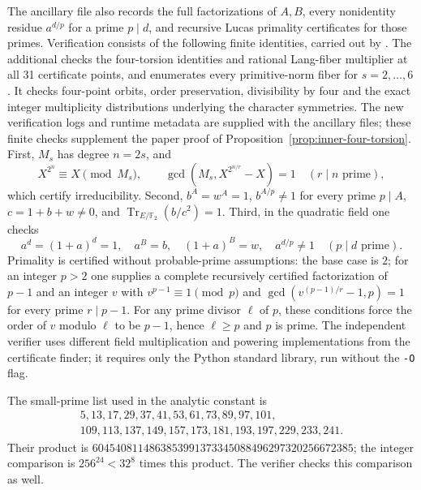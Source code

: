 \documentclass[11pt]{article}
\begin{document}
The ancillary file  also records
the full factorizations of $A,B$, every nonidentity residue
$a^{d/p}$ for a prime $p\mid d$, and recursive Lucas primality
certificates for those primes. Verification consists of the following
finite identities, carried out by .
The additional  checks the
four-torsion identities and rational Lang-fiber multiplier at
all 31 certificate points, and enumerates every primitive-norm
fiber for $s=2,\ldots,6$. It checks four-point orbits, order
preservation, divisibility by four and the exact integer
multiplicity distributions underlying the character symmetries.
The new verification logs and runtime metadata are supplied with
the ancillary files; these finite checks supplement the paper
proof of Proposition~\ref{prop:inner-four-torsion}.
First, $M_s$ has degree $n=2s$, and
\[
 X^{2^n}\equiv X\pmod {M_s},\qquad
 \gcd(M_s,X^{2^{n/r}}-X)=1\quad(r\mid n\text{ prime}),
\]
which certify irreducibility. Second, $b^A=w^A=1$,
$b^{A/p}\ne1$ for every prime $p\mid A$, $c=1+b+w\ne0$,
and $\operatorname{Tr}_{E/\mathbb F_2}(b/c^2)=1$.
Third, in the quadratic field one checks
\[
 a^d=(1+a)^d=1,\quad a^B=b,\quad(1+a)^B=w,\quad
 a^{d/p}\ne1\quad(p\mid d\text{ prime}).
\]
Primality is certified without probable-prime assumptions: the base
case is $2$; for an integer $p>2$ one supplies a complete recursively
certified factorization of $p-1$ and an integer $v$ with
$v^{p-1}\equiv1\pmod p$ and
$\gcd(v^{(p-1)/r}-1,p)=1$ for every prime $r\mid p-1$.
For any prime divisor $\ell$ of $p$, these conditions force the order
of $v$ modulo $\ell$ to be $p-1$, hence $\ell\ge p$ and $p$ is prime.
The independent verifier uses different field multiplication and
powering implementations from the certificate finder; it requires
only the Python standard library, run without the \texttt{-O} flag.

The small-prime list used in the analytic constant is
\[
\begin{gathered}
5,13,17,29,37,41,53,61,73,89,97,101,\\
109,113,137,149,157,173,181,193,197,229,233,241.
\end{gathered}
\]
Their product is
$6045408114863853991373345088496297320256672385$;
the integer comparison is $256^{24}<32^8$ times this product.
The verifier checks this comparison as well.
\end{document}
